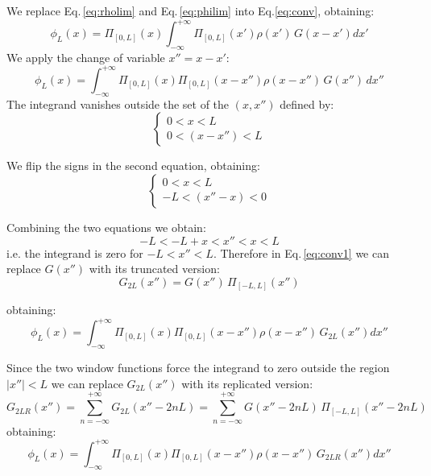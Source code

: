 We replace Eq.\,\eqref{eq:rholim} and Eq.\,\eqref{eq:philim} into Eq.\eqref{eq:conv}, obtaining:
\begin{equation}
\phi_L(x) = \Pi_{[0,L]}\left( x\right)
\int_{-\infty}^{+\infty} 
\Pi_{[0,L]}\left(x'\right)
\rho(x')\,G(x-x') dx'
\end{equation}
We apply the change of variable $x'' = x - x'$:
\begin{equation}
\phi_L(x) = 
\int_{-\infty}^{+\infty} 
\Pi_{[0,L]}\left({x}\right)
\Pi_{[0,L]}\left({x-x''}\right)
\rho(x-x'')\,G(x'') \,dx''
\label{eq:conv1}
\end{equation}
The integrand vanishes outside the set of the $(x, x'')$ defined by:
\begin{equation}
\begin{cases}
0 < x <{L}\\
0 < (x-x'') <{L}
\end{cases}
\end{equation}

We flip the signs in the second equation, obtaining:
\begin{equation}
\begin{cases}
0 < x <{L}\\
-L < (x''-x) <0
\end{cases}
\end{equation}

Combining the two equations we obtain:
\begin{equation}
-L<-L + x < x'' <x<L
\end{equation}
i.e. the integrand is zero for $-L<x''<L$.
Therefore in Eq.\,\eqref{eq:conv1} we can replace $G(x'')$ with its truncated version:
\begin{equation}
G_{2L}(x'') = G(x'')\,\Pi_{[-L,L]}
\left(
{x''}
\right)
\end{equation}

obtaining:
\begin{equation}
\phi_L(x) = 
\int_{-\infty}^{+\infty} 
\Pi_{[0,L]}\left({x}\right)
\Pi_{[0,L]}\left({x-x''}\right)
\rho(x-x'')\,G_{2L}(x'') dx''
\label{eq:conv2}
\end{equation}

Since the two window functions force the integrand to zero outside the region $|x''|<L$ we can replace $G_{2L}(x'')$ with its replicated version:
\begin{equation}
G_{2LR}(x'') = \sum_{n=-\infty}^{+\infty}G_{2L}(x''-2nL) = \sum_{n=-\infty}^{+\infty}G(x'' -2nL)\,\Pi_{[-L,L]}
\left(
{x''-2nL}
\right)
\label{eq:GLR}
\end{equation}
obtaining:
\begin{equation}
\phi_L(x) = 
\int_{-\infty}^{+\infty} 
\Pi_{[0,L]}\left({x}\right)
\Pi_{[0,L]}\left({x-x''}\right)
\rho(x-x'')\,G_{2LR}(x'') dx''
\end{equation}

